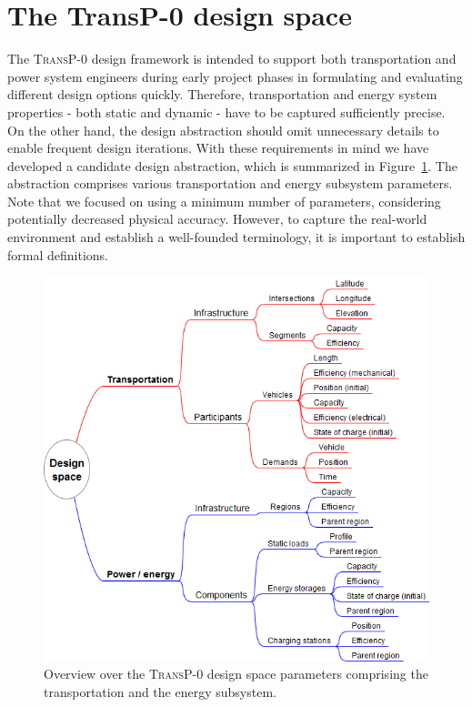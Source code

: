 \section{The \textbf{TransP-0} design space}
\label{proposed_model}
The \textsc{TransP-0} design framework is intended to support both transportation and power system engineers
during early project phases 
in formulating and evaluating different design options quickly. Therefore, transportation and energy system properties - both static and dynamic - have to be captured sufficiently precise. On the other hand, the design abstraction should omit unnecessary details to enable frequent design iterations. With these requirements in mind we have developed a candidate design abstraction, which is summarized in Figure~\ref{system_design}. The abstraction comprises various transportation and energy subsystem parameters. Note that we focused on using a minimum number of parameters, considering potentially decreased physical accuracy. However, to capture the real-world environment and establish a well-founded terminology, it is important to establish formal definitions.
\begin{figure}[h!]
	\begin{center}
	\includegraphics[trim=0 10 0 0, width=0.875\columnwidth]{./gfx/system_design.png}
	\caption{Overview over the \textsc{TransP-0} design space parameters comprising the transportation and the energy subsystem.}
	\label{system_design}
	\end{center}
\end{figure}

